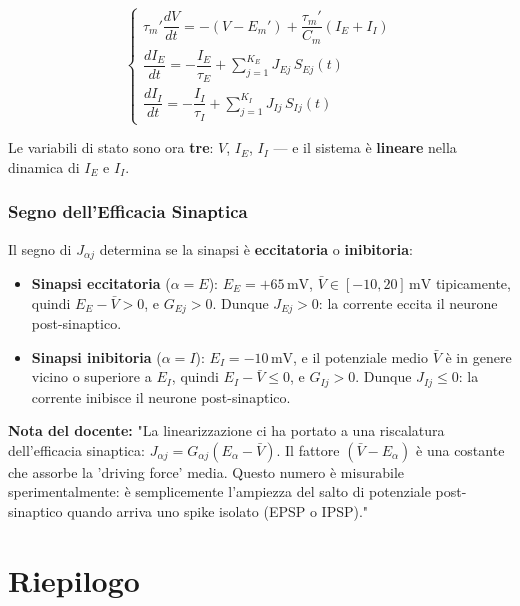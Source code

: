 \begin{equation}
\begin{cases}
\tau_m' \dfrac{dV}{dt} = -(V - E_m') + \dfrac{\tau_m'}{C_m}(I_E + I_I) \\[8pt]
\dfrac{d I_E}{dt} = -\dfrac{I_E}{\tau_E} + \displaystyle\sum_{j=1}^{K_E} J_{Ej}\, S_{Ej}(t) \\[8pt]
\dfrac{d I_I}{dt} = -\dfrac{I_I}{\tau_I} + \displaystyle\sum_{j=1}^{K_I} J_{Ij}\, S_{Ij}(t)
\end{cases}
\end{equation}

Le variabili di stato sono ora \textbf{tre}: $V$, $I_E$, $I_I$ — e il sistema è \textbf{lineare} nella dinamica di $I_E$ e $I_I$.

\subsubsection{Segno dell'Efficacia Sinaptica}

Il segno di $J_{\alpha j}$ determina se la sinapsi è \textbf{eccitatoria} o \textbf{inibitoria}:

\begin{itemize}
    \item \textbf{Sinapsi eccitatoria} ($\alpha = E$): $E_E = +65\,\text{mV}$, $\bar{V} \in [-10, 20]\,\text{mV}$ tipicamente, quindi $E_E - \bar{V} > 0$, e $G_{Ej} > 0$. Dunque $J_{Ej} > 0$: la corrente eccita il neurone post-sinaptico.
    \item \textbf{Sinapsi inibitoria} ($\alpha = I$): $E_I = -10\,\text{mV}$, e il potenziale medio $\bar{V}$ è in genere vicino o superiore a $E_I$, quindi $E_I - \bar{V} \leq 0$, e $G_{Ij} > 0$. Dunque $J_{Ij} \leq 0$: la corrente inibisce il neurone post-sinaptico.
\end{itemize}

\begin{tcolorbox}[colback=gray!5, colframe=gray!40, arc=2mm, boxrule=0.5pt]
\textbf{Nota del docente:} "La linearizzazione ci ha portato a una riscalatura dell'efficacia sinaptica: $J_{\alpha j} = G_{\alpha j} (E_\alpha - \bar{V})$. Il fattore $(\bar{V} - E_\alpha)$ è una costante che assorbe la 'driving force' media. Questo numero è misurabile sperimentalmente: è semplicemente l'ampiezza del salto di potenziale post-sinaptico quando arriva uno spike isolato (EPSP o IPSP)."
\end{tcolorbox}


\section{Riepilogo}

